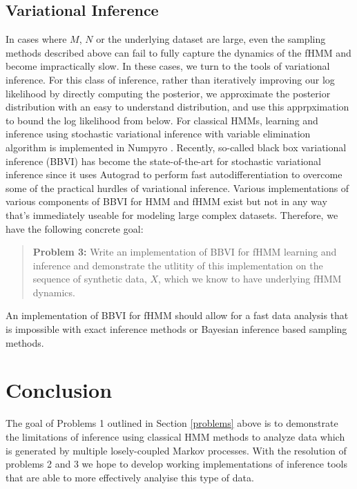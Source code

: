 \documentclass{article}
\begin{document}
\subsection{Variational Inference}
In cases where $M$, $N$ or the underlying dataset are large, even the sampling methods described above can fail to fully capture the dynamics of the fHMM and become impractically slow.  In these cases, we turn to the tools of variational inference. For this class of inference, rather than iteratively improving our log likelihood by directly computing the posterior, we approximate the posterior distribution with an easy to understand distribution, and use this apprpximation to bound the log likelihood from below. For classical HMMs, learning and inference using stochastic variational inference with variable elimination algorithm is implemented in Numpyro \cite{B18,U19}.  Recently, so-called black box variational inference (BBVI) \cite{DA15} has become the state-of-the-art for stochastic variational inference since it uses Autograd to perform fast autodifferentiation to overcome some of the practical hurdles of variational inference.  Various implementations of various components of BBVI for HMM and fHMM exist but not in any way that's immediately useable for modeling large complex datasets.  Therefore, we have the following concrete goal:

\begin{quote}
\textbf{Problem 3:} Write an implementation of BBVI for fHMM learning and inference and demonstrate the utlitity of this implementation on the sequence of synthetic data, $X$, which we know to have underlying fHMM dynamics.
\end{quote}  
An implementation of BBVI for fHMM should allow for a fast data analysis that is impossible with exact inference methods or Bayesian inference based sampling methods.

\section{Conclusion}

The goal of Problems 1 outlined in Section \ref{problems} above is to demonstrate the limitations  of inference using classical HMM methods to analyze data which is generated by multiple losely-coupled Markov processes.  With the resolution of problems 2 and 3 we hope to develop working implementations of inference tools that are able to more effectively analyise this type of data.    



\end{document}
